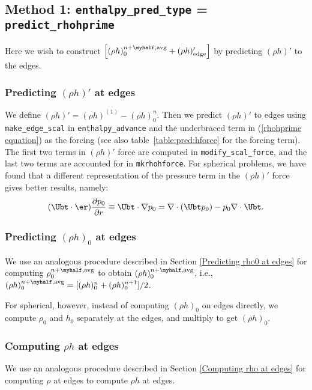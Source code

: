 \subsection{Method 1: {\tt enthalpy\_pred\_type} = {\tt predict\_rhohprime}}

Here we wish to construct $\left [ (\rho h)_0^{n+\myhalf,{\rm avg}} + (\rho
  h)'_\mathrm{edge} \right ]$ by predicting $(\rho h)'$ to the edges.

\subsubsection{Predicting $(\rho h)'$ at edges}\label{Predicting rhohprime at edges}

We define $(\rho h)' = (\rho h)^{(1)} - (\rho h)_0^n$.  Then we predict 
$(\rho h)'$ to edges using {\tt make\_edge\_scal} in {\tt enthalpy\_advance} 
and the underbraced term in (\ref{rhohprime equation}) as the forcing (see
also table~\ref{table:pred:hforce} for the forcing term).
The first two terms in $(\rho h)'$ force are computed in 
{\tt modify\_scal\_force}, and the last two terms are accounted for in
{\tt mkrhohforce}.  For spherical problems, we have found that a different 
representation of the pressure term in the $(\rho h)'$ force gives better
results, namely:
\begin{equation}
(\Ubt \cdot \er)\frac{\partial p_0}{\partial r} \equiv \Ubt\cdot\nabla p_0 = 
\nabla\cdot(\Ubt p_0) - p_0\nabla\cdot\Ubt.
\end{equation}



\subsubsection{Predicting $(\rho h)_0$ at edges}
We use an analogous procedure described in Section \ref{Predicting
rho0 at edges} for computing $\rho_0^{n+\myhalf,\rm{avg}}$ to obtain 
$(\rho h)_0^{n+\myhalf,\rm{avg}}$, i.e., 
$(\rho h)_0^{n+\myhalf,{\rm avg}} = [(\rho h)_0^{n} + (\rho h)_0^{n+1}]/2$.

For spherical, however, instead of computing $(\rho h)_0$ on edges
directly, we compute $\rho_0$ and $h_0$ separately at the edges, and
multiply to get $(\rho h)_0$.


\subsubsection{Computing $\rho h$ at edges}
We use an analogous procedure described in Section \ref{Computing rho
  at edges} for computing $\rho$ at edges to compute $\rho h$ at
edges.  


